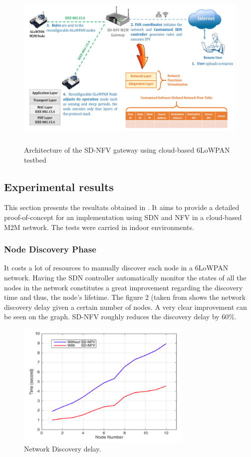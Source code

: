 \documentclass[10pt,journal,compsoc]{IEEEtran}
\begin{document}
\begin{figure}
    \center
    \includegraphics[height=80mm]{architecture}
    \caption{Architecture of the SD-NFV gateway using cloud-based 
    6LoWPAN testbed}
\end{figure}

\subsection{Experimental results}

This section presents the resultats obtained in \cite{main}.
It aims to provide a detailed proof-of-concept for an 
implementation using SDN and NFV in a cloud-based M2M network. The 
tests were carried in indoor environments. 

\subsubsection{Node Discovery Phase}

It costs a lot of resources to manually discover each node in a 
6LoWPAN network. Having the SDN controller automatically monitor the 
states of all the nodes in the network constitutes a great improvement 
regarding the discovery time and thus, the node's lifetime. The figure 2 
(taken from \cite{main} shows the network discovery delay given a 
certain number of nodes. A very clear improvement can be seen 
on the graph. SD-NFV roughly reduces the discovery delay by 60\%. 

\begin{figure}
  \includegraphics[height=60mm]{nd_delay}
  \caption{Network Discovery delay.}
\end{figure}
\end{document}
